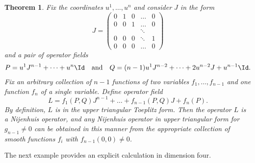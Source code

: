 \documentclass[12pt]{article}
\newtheorem{Theorem}{Theorem}
\theoremstyle{remark}
\begin{document}
\begin{Theorem}\label{t2}
Fix the coordinates $u^1, \dots, u^n$ and consider $J$ in the form
$$
J = \left( \begin{array}{ccccc}
     0 & 1 & 0 & \dots & 0 \\
     0 & 0 & 1 & \dots & 0 \\
      & & & \ddots & \\
      0 & 0 & 0 & \ddots & 1\\
      0 & 0 & 0 & \dots & 0
\end{array}\right) 
$$
and a pair of operator fields
$$
P = u^1 J^{n - 1} + \dots + u^n\Id \quad \text{and} \quad Q = (n - 1) u^1 J^{n - 2} + \dots + 2u^{n - 2} J + u^{n - 1} \Id.
$$
Fix an arbitrary collection of $n - 1$ functions of two variables $f_1, \dots, f_{n - 1}$ and one function $f_n$ of a single variable. Define  operator field
\begin{equation}\label{solution}
L = f_1(P, Q) J^{n - 1} + \dots + f_{n - 1}(P, Q) J + f_n(P).     
\end{equation}
By definition, $L$ is in the upper triangular Toeplitz form. Then the operator $L$ is a Nijenhuis operator, and any Nijenhuis operator in upper triangular form for $g_{n - 1} \neq 0$ can be obtained in this manner from the appropriate collection of smooth functions $f_i$ with $f_{n - 1} (0, 0) \neq 0$.   
\end{Theorem}

The next example provides an explicit calculation in dimension four.
\end{document}
